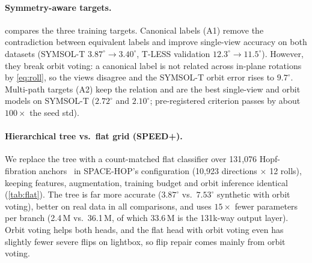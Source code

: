 \begin{table}[t]
  \centering\footnotesize
  \setlength{\tabcolsep}{2.4pt}
  \resizebox{\linewidth}{!}{}
  \caption{\textbf{Training targets for symmetric objects} (symmetry-aware mean error, PoE). Single annotated label (A0), canonical label closest to identity (A1), and all equivalent rotations (A2, \cref{eq:symloss}); the last block adds orbit distillation on top of the selected target.}
  \label{tab:sym}
\end{table}

\paragraph{Symmetry-aware targets.}
\label{sec:abl_sym}
 compares the three training targets. Canonical labels (A1) remove the contradiction between equivalent labels and improve single-view accuracy on both datasets (SYMSOL-T $3.87^\circ\to3.40^\circ$, T-LESS validation $12.3^\circ\to11.5^\circ$). However, they break orbit voting: a canonical label is not related across in-plane rotations by \cref{eq:roll}, so the views disagree and the SYMSOL-T orbit error rises to $9.7^\circ$. Multi-path targets (A2) keep the relation and are the best single-view and orbit models on SYMSOL-T ($2.72^\circ$ and $2.10^\circ$; pre-registered criterion passes by about $100\times$ the seed std).

\begin{table}[t]
  \centering\small
  \setlength{\tabcolsep}{3pt}
  \resizebox{\linewidth}{!}{}
  \caption{\textbf{Tree vs.\ flat grid} (PoE, mean error in $^\circ$). Same frozen features, augmentation, training budget and orbit inference (4 views, top-8 per view). Floor: mean error of the nearest anchor (tree: its leaf) on the synthetic-validation rotations. The \emph{same-grid} flat head classifies the tree's own 131,072 leaves, isolating hierarchical prediction; the balanced Hopf grid tests an alternative discretisation of the same size. 3 seeds (± seed std).}
  \label{tab:flat}
\end{table}

\paragraph{Hierarchical tree vs.\ flat grid (SPEED+).}
\label{sec:abl_flat}
We replace the tree with a count-matched flat classifier over 131,076 Hopf-fibration anchors~\cite{yershova2010hopf} in SPACE-HOP's configuration (10,923 directions $\times$ 12 rolls), keeping features, augmentation, training budget and orbit inference identical (\cref{tab:flat}). The tree is far more accurate ($3.87^\circ$ vs.\ $7.53^\circ$ synthetic with orbit voting), better on real data in all comparisons, and uses $15\times$ fewer parameters per branch (2.4\,M vs.\ 36.1\,M, of which 33.6\,M is the 131k-way output layer). Orbit voting helps both heads, and the flat head with orbit voting even has slightly fewer severe flips on lightbox, so flip repair comes mainly from orbit voting.

